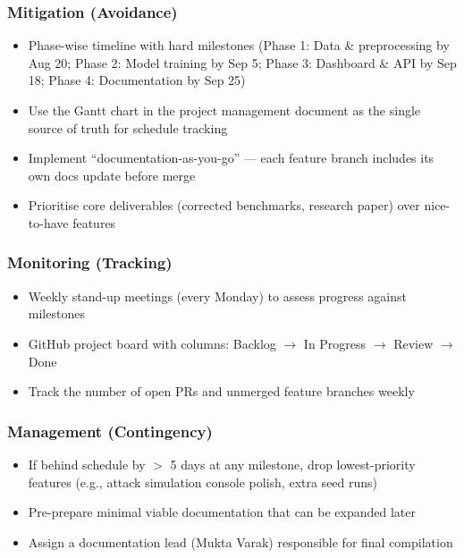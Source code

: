 \documentclass[11pt, a4paper]{article}
\begin{document}
\subsubsection*{Mitigation (Avoidance)}
\begin{itemize}[leftmargin=*]
    \item Phase-wise timeline with hard milestones (Phase 1: Data \& preprocessing by Aug 20; Phase 2: Model training by Sep 5; Phase 3: Dashboard \& API by Sep 18; Phase 4: Documentation by Sep 25)
    \item Use the Gantt chart in the project management document as the single source of truth for schedule tracking
    \item Implement ``documentation-as-you-go'' --- each feature branch includes its own docs update before merge
    \item Prioritise core deliverables (corrected benchmarks, research paper) over nice-to-have features
\end{itemize}

\subsubsection*{Monitoring (Tracking)}
\begin{itemize}[leftmargin=*]
    \item Weekly stand-up meetings (every Monday) to assess progress against milestones
    \item GitHub project board with columns: Backlog $\to$ In Progress $\to$ Review $\to$ Done
    \item Track the number of open PRs and unmerged feature branches weekly
\end{itemize}

\subsubsection*{Management (Contingency)}
\begin{itemize}[leftmargin=*]
    \item If behind schedule by $>$ 5 days at any milestone, drop lowest-priority features (e.g., attack simulation console polish, extra seed runs)
    \item Pre-prepare minimal viable documentation that can be expanded later
    \item Assign a documentation lead (Mukta Varak) responsible for final compilation
\end{itemize}
\end{document}
